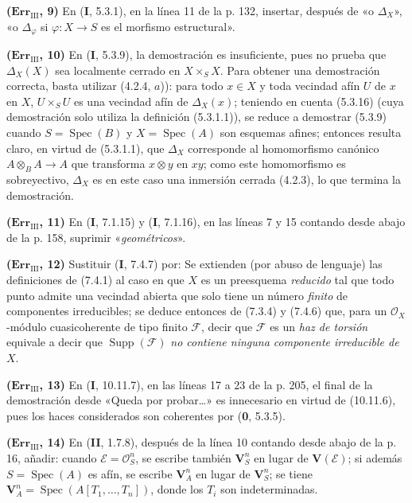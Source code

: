 \noindent\textbf{($\mathbf{Err}_{\mathrm{III}}$, 9)} En (\textbf I, 5.3.1), en la
línea 11 de la p. 132, insertar, después de «o $\Delta_X$», «o $\Delta_\varphi$
si $\varphi:X\to S$ es el morfismo estructural».

\noindent\textbf{($\mathbf{Err}_{\mathrm{III}}$, 10)} En (\textbf I, 5.3.9), la
demostración es insuficiente, pues no prueba que $\Delta_X(X)$ sea localmente
cerrado en $X\times_SX$. Para obtener una demostración correcta, basta utilizar
(4.2.4, $a$)): para todo $x\in X$ y toda vecindad afín $U$ de $x$ en $X$,
$U\times_SU$ es una vecindad afín de $\Delta_X(x)$; teniendo en cuenta (5.3.16)
(cuya demostración solo utiliza la definición (5.3.1.1)), se reduce a demostrar
(5.3.9) cuando $S=\operatorname{Spec}(B)$ y $X=\operatorname{Spec}(A)$ son
esquemas afines; entonces resulta claro, en virtud de (5.3.1.1), que $\Delta_X$
corresponde al homomorfismo canónico $A\otimes_BA\to A$ que transforma
$x\otimes y$ en $xy$; como este homomorfismo es sobreyectivo, $\Delta_X$ es en
este caso una inmersión cerrada (4.2.3), lo que termina la demostración.

\noindent\textbf{($\mathbf{Err}_{\mathrm{III}}$, 11)} En (\textbf I, 7.1.15) y
(\textbf I, 7.1.16), en las líneas 7 y 15 contando desde abajo de la p. 158, suprimir
«\emph{geométricos}».

\noindent\textbf{($\mathbf{Err}_{\mathrm{III}}$, 12)} Sustituir (\textbf I, 7.4.7)
por: Se extienden (por abuso de lenguaje) las definiciones de (7.4.1) al caso
en que $X$ es un preesquema \emph{reducido} tal que todo punto admite una
vecindad abierta que solo tiene un número \emph{finito} de componentes
irreducibles; se deduce entonces de (7.3.4) y (7.4.6) que, para un
$\mathscr O_X$-módulo cuasicoherente de tipo finito $\mathscr F$, decir que
$\mathscr F$ es un \emph{haz de torsión} equivale a decir que
$\operatorname{Supp}(\mathscr F)$ \emph{no contiene ninguna componente
irreducible de $X$}.

\noindent\textbf{($\mathbf{Err}_{\mathrm{III}}$, 13)} En (\textbf I, 10.11.7), en
las líneas 17 a 23 de la p. 205, el final de la demostración desde «Queda por
probar\ldots{}» es innecesario en virtud de (10.11.6), pues los haces
considerados son coherentes por (\textbf{0}, 5.3.5).

\noindent\textbf{($\mathbf{Err}_{\mathrm{III}}$, 14)} En (\textbf{II}, 1.7.8),
después de la línea 10 contando desde abajo de la p. 16, añadir: cuando
$\mathscr E=\mathscr O_S^n$, se escribe también $\mathbf V_S^n$ en lugar de
$\mathbf V(\mathscr E)$; si además $S=\operatorname{Spec}(A)$ es afín, se
escribe $\mathbf V_A^n$ en lugar de $\mathbf V_S^n$; se tiene
$\mathbf V_A^n=\operatorname{Spec}(A[T_1,\ldots,T_n])$, donde los $T_i$ son
indeterminadas.

